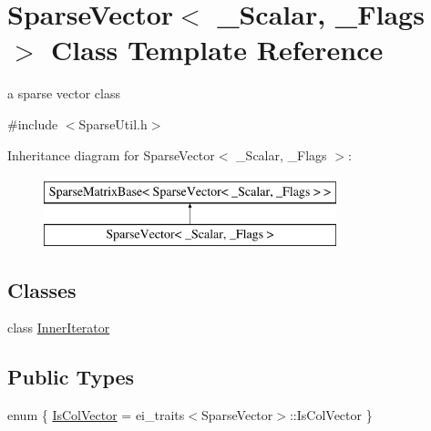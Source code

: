 \hypertarget{class_sparse_vector}{\section{Sparse\-Vector$<$ \-\_\-\-Scalar, \-\_\-\-Flags $>$ Class Template Reference}
\label{class_sparse_vector}
}


a sparse vector class  




{\ttfamily \#include $<$Sparse\-Util.\-h$>$}

Inheritance diagram for Sparse\-Vector$<$ \-\_\-\-Scalar, \-\_\-\-Flags $>$\-:\begin{figure}[H]
\begin{center}
\leavevmode
\includegraphics[height=2.000000cm]{class_sparse_vector}
\end{center}
\end{figure}
\subsection*{Classes}
\begin{DoxyCompactItemize}
\item 
class \hyperlink{class_sparse_vector_1_1_inner_iterator}{Inner\-Iterator}
\end{DoxyCompactItemize}
\subsection*{Public Types}
\begin{DoxyCompactItemize}
\item 
enum \{ \hyperlink{class_sparse_vector_a9b64ff6343f93a1481d68f04e2da2f65a141068667acadaaeb792a2cc02dcea7c}{Is\-Col\-Vector} = ei\-\_\-traits$<$Sparse\-Vector$>$\-:\-:Is\-Col\-Vector
 \}
\end{DoxyCompactItemize}
